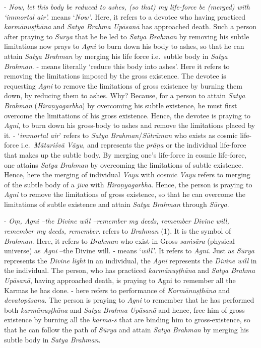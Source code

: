- \emph{Now, let this body be reduced to ashes, (so that) my life-force be (merged) with `immortal air'.}  means `\emph{Now'}. Here, it refers to a devotee who having practiced \emph{karmānuṣṭhāna} and \emph{Satya Brahma Upāsanā} has approached death. Such a person after praying to \emph{Sūrya} that he be led to \emph{Satya Brahman} by removing his subtle limitations now prays to \emph{Agni} to burn down his body to ashes, so that he can attain \emph{Satya Brahman} by merging his life force i.e.\ subtle body in \emph{Satya Brahman}. - means literally `reduce this body into ashes'. Here it refers to removing the limitations imposed by the gross existence. The devotee is requesting \emph{Agni} to remove the limitations of gross existence by burning them down, by reducing them to ashes. Why? Because, for a person to attain \emph{Satya Brahman} (\emph{Hiraṇyagarbha}) by overcoming his subtle existence, he must first overcome the limitations of his gross existence. Hence, the devotee is praying to \emph{Agni}, to burn down his gross-body to ashes and remove the limitations placed by it. - `\emph{immortal air}' refers to \emph{Satya Brahman}/\emph{Sūtrāman} who exists as cosmic life-force i.e.\ \emph{Mātariśvā Vāyu}, and  represents the \emph{prāṇa} or the individual life-force that makes up the subtle body. By merging one's life-force in cosmic life-force, one attains \emph{Satya Brahman} by overcoming the limitations of subtle existence. Hence, here the merging of individual \emph{Vāyu} with cosmic \emph{Vāyu} refers to merging of the subtle body of a \emph{jīva} with \emph{Hiraṇyagarbha}. Hence, the person is praying to \emph{Agni} to remove the limitations of gross existence, so that he can overcome the limitations of subtle existence and attain \emph{Satya Brahman} through \emph{Sūrya}.

- \emph{Oṃ, Agni --the Divine will --remember my deeds, remember Divine will, remember my deeds, remember}.  refers to \emph{Brahman} (1). It is the symbol of \emph{Brahman}. Here, it refers to \emph{Brahman} who exist in Gross \emph{saṁsāra} (physical universe) as \emph{Agni} --the Divine will. - means `\emph{will'}. It refers to \emph{Agni}. Just as \emph{Sūrya} represents the \emph{Divine light} in an individual, the \emph{Agni} represents the \emph{Divine will} in the individual. The person, who has practiced \emph{karmānuṣṭhāna} and \emph{Satya Brahma Upāsanā}, having approached death, is praying to Agni to remember all the Karmas he has done. - here refers to performance of \emph{Karmānuṣṭhāna} and \emph{devatopāsana}. The person is praying to \emph{Agni} to remember that he has performed both \emph{karmānuṣṭhāna} and \emph{Satya Brahma Upāsanā} and hence, free him of gross existence by burning all the \emph{karma-s} that are binding him to gross-existence, so that he can follow the path of \emph{Sūrya} and attain \emph{Satya Brahman} by merging his subtle body in \emph{Satya Brahman}.

